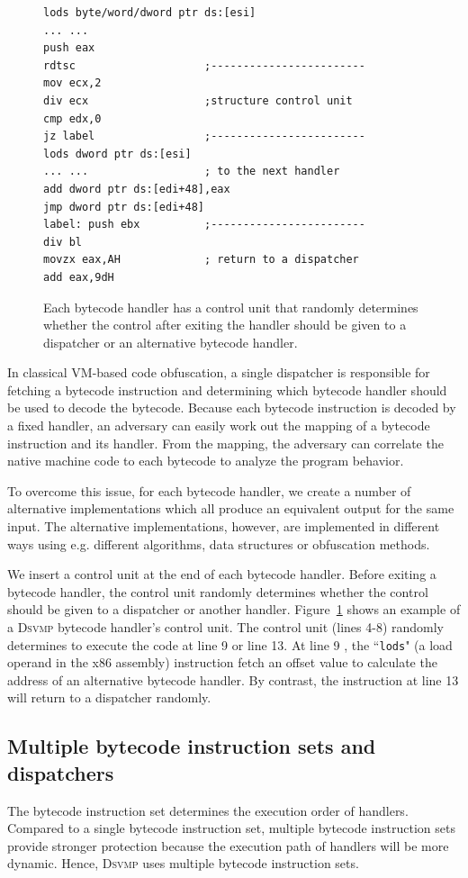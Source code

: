 \documentclass[conference]{IEEEtran}
\newcommand{\DSVMP}{\textsc{Dsvmp}\xspace}
\begin{document}
\begin{figure}[t!]
\scriptsize
\begin{lstlisting}
lods byte/word/dword ptr ds:[esi]
... ...
push eax
rdtsc                    ;------------------------
mov ecx,2
div ecx                  ;structure control unit
cmp edx,0
jz label                 ;------------------------
lods dword ptr ds:[esi]
... ...                  ; to the next handler
add dword ptr ds:[edi+48],eax
jmp dword ptr ds:[edi+48]
label: push ebx          ;------------------------
div bl
movzx eax,AH             ; return to a dispatcher
add eax,9dH
\end{lstlisting}
\vspace{-2mm}
\caption{Each bytecode handler has a control unit that randomly determines whether the control after exiting the handler should be given to a dispatcher or an alternative bytecode handler. }
\vspace{-5mm}
\label{fig:newhandler}
\end{figure}

In classical VM-based code obfuscation, a single dispatcher is responsible for fetching a bytecode instruction and
determining which bytecode handler should be used to decode the bytecode. Because each bytecode instruction
is decoded by a fixed handler, an adversary can easily work out the mapping of a bytecode instruction and its
handler. From the mapping, the adversary can correlate the native machine code to each bytecode to analyze the
program behavior.

To overcome this issue, for each bytecode handler, we create a number of alternative implementations which all
produce an equivalent output for the same input. The alternative implementations, however,
are implemented in different ways using e.g. different algorithms, data structures or obfuscation methods.

We insert a control unit at the end of each bytecode handler. Before exiting a bytecode handler,
the control unit randomly determines whether the control should be given to a dispatcher or
another handler. Figure~\ref{fig:newhandler} shows an example of a \DSVMP bytecode handler's control unit.
The control unit (lines 4-8) randomly determines to execute the code at line 9 or line 13.
At line 9 , the ``\texttt{lods}" (a load operand in the x86 assembly) instruction fetch an offset value
to calculate the address of an alternative bytecode handler. By contrast, the instruction at line 13 will return to a dispatcher randomly.


\subsection{Multiple bytecode instruction sets and dispatchers \label{sec:mbd}}
The bytecode instruction set determines the execution order of handlers. Compared to a single bytecode instruction set,
multiple bytecode instruction sets provide stronger protection because the execution path of handlers will be more dynamic.
Hence, \DSVMP uses multiple bytecode instruction sets.
\end{document}
